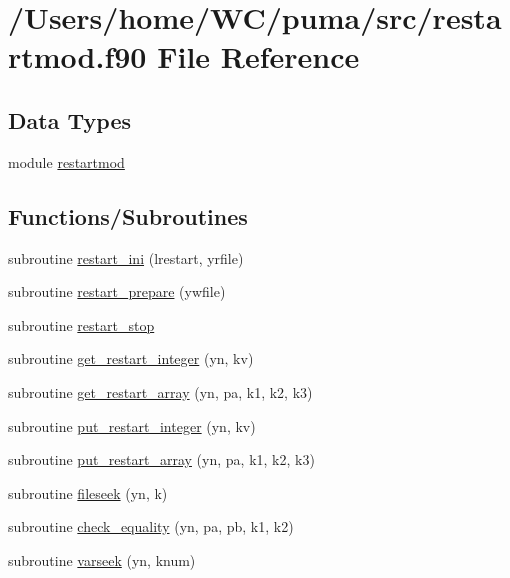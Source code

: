 \hypertarget{restartmod_8f90}{
\section{/\-Users/home/\-W\-C/puma/src/restartmod.f90 \-File \-Reference}
\label{restartmod_8f90}
}
\subsection*{\-Data \-Types}
\begin{DoxyCompactItemize}
\item 
module \hyperlink{classrestartmod}{restartmod}
\end{DoxyCompactItemize}
\subsection*{\-Functions/\-Subroutines}
\begin{DoxyCompactItemize}
\item 
subroutine \hyperlink{restartmod_8f90_a1afb89bd2af13e06ddcbeeb393eeb191}{restart\-\_\-ini} (lrestart, yrfile)
\item 
subroutine \hyperlink{restartmod_8f90_affb1e8d0fa727d359e1292ada8ba0f2b}{restart\-\_\-prepare} (ywfile)
\item 
subroutine \hyperlink{restartmod_8f90_a1a30dfa47b42e8b1354434ebf55eb6f7}{restart\-\_\-stop}
\item 
subroutine \hyperlink{restartmod_8f90_a31b0dacd7c45db47ddaedb4d402b44ba}{get\-\_\-restart\-\_\-integer} (yn, kv)
\item 
subroutine \hyperlink{restartmod_8f90_af0f1ce9b6762aa2537cc22d5fc319b7c}{get\-\_\-restart\-\_\-array} (yn, pa, k1, k2, k3)
\item 
subroutine \hyperlink{restartmod_8f90_a16bdaf2753fbc691f99b0837e5de11db}{put\-\_\-restart\-\_\-integer} (yn, kv)
\item 
subroutine \hyperlink{restartmod_8f90_a52485001dbbaed032e48d894e6302c22}{put\-\_\-restart\-\_\-array} (yn, pa, k1, k2, k3)
\item 
subroutine \hyperlink{restartmod_8f90_a448c48ee0bf18c6f95ca432ec7f04666}{fileseek} (yn, k)
\item 
subroutine \hyperlink{restartmod_8f90_a76d8e5ad55db13cfbbb15b57d81b5073}{check\-\_\-equality} (yn, pa, pb, k1, k2)
\item 
subroutine \hyperlink{restartmod_8f90_a715f93e4ee50830196f64c403c7bdeed}{varseek} (yn, knum)
\end{DoxyCompactItemize}


